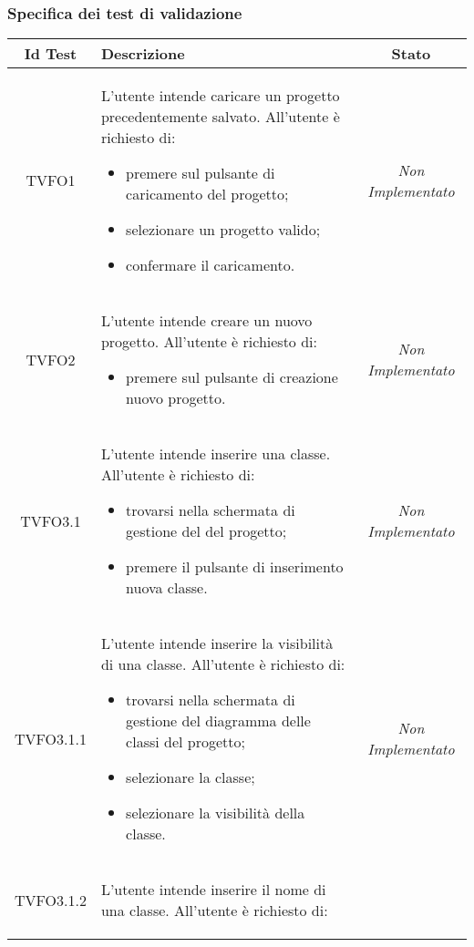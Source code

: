 \subsubsection{Specifica dei test di validazione}
\normalsize
\begin{longtable}{|c|>{}m{8cm}|c|}
\hline 
\textbf{Id Test} & \textbf{Descrizione} & \textbf{Stato}\\
\hline
\endhead
\hypertarget{TVFO1}{TVFO1} & L'utente intende caricare un progetto precedentemente salvato. All'utente è richiesto di:
\begin{itemize}
	\item premere sul pulsante di caricamento del progetto;
	\item selezionare un progetto valido;
	\item confermare il caricamento.
\end{itemize}
 & \textit{Non Implementato}\\ \hline
\hypertarget{TVFO2}{TVFO2} & L'utente intende creare un  nuovo progetto.
All'utente è richiesto di:
\begin{itemize}
	\item premere sul pulsante di creazione nuovo progetto.
\end{itemize} & \textit{Non Implementato}\\ \hline
\hypertarget{TVFO3.1}{TVFO3.1} & L'utente intende inserire una classe.
All'utente è richiesto di:
\begin{itemize}
	\item trovarsi nella schermata di gestione del \gloss{diagramma delle classi} del progetto;
	\item premere il pulsante di inserimento nuova classe.
\end{itemize} & \textit{Non Implementato}\\ \hline
\hypertarget{TVFO3.1.1}{TVFO3.1.1} & L'utente intende inserire la visibilità di una classe.
All'utente è richiesto di:
\begin{itemize}
	\item trovarsi nella schermata di gestione del diagramma delle classi del progetto;
	\item selezionare la classe;
	\item selezionare la visibilità della classe.
\end{itemize} & \textit{Non Implementato}\\ \hline
\hypertarget{TVFO3.1.2}{TVFO3.1.2} & L'utente intende inserire il nome di una classe.
All'utente è richiesto di:
\begin{itemize}

\end{itemize}
\end{longtable}
